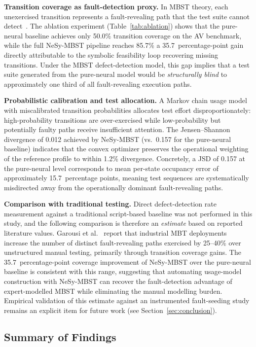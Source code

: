 \textbf{Transition coverage as fault-detection proxy.}
In MBST theory, each unexercised transition represents a fault-revealing
path that the test suite cannot detect~\cite{whittaker1993markov}.
The ablation experiment (Table~\ref{tab:ablation}) shows that the
pure-neural baseline achieves only 50.0\% transition coverage on the
AV benchmark, while the full NeSy-MBST pipeline reaches 85.7\% a
35.7~percentage-point gain directly attributable to the symbolic
feasibility loop recovering missing transitions.  Under the MBST
defect-detection model, this gap implies that a test suite generated
from the pure-neural model would be \emph{structurally blind} to
approximately one third of all fault-revealing execution paths.

\textbf{Probabilistic calibration and test allocation.}
A Markov chain usage model with miscalibrated transition probabilities
allocates test effort disproportionately: high-probability transitions
are over-exercised while low-probability but potentially faulty paths
receive insufficient attention.  The Jensen--Shannon divergence of
0.012 achieved by NeSy-MBST (vs.\ 0.157 for the pure-neural baseline)
indicates that the convex optimizer preserves the operational weighting
of the reference profile to within 1.2\% divergence.  Concretely,
a JSD of 0.157 at the pure-neural level corresponds to mean per-state
occupancy error of approximately 15.7~percentage points, meaning test
sequences are systematically misdirected away from the operationally
dominant fault-revealing paths.

\textbf{Comparison with traditional testing.}
Direct defect-detection rate measurement against a traditional
script-based baseline was not performed in this study, and the
following comparison is therefore an \emph{estimate} based on
reported literature values.  Garousi et al.~\cite{garousi2021mbt_practice}
report that industrial MBT deployments increase the number of
distinct fault-revealing paths exercised by 25--40\% over
unstructured manual testing, primarily through transition coverage
gains.  The 35.7~percentage-point coverage improvement of NeSy-MBST
over the pure-neural baseline is consistent with this range, suggesting
that automating usage-model construction with NeSy-MBST can recover
the fault-detection advantage of expert-modelled MBST while eliminating
the manual modelling burden.  Empirical validation of this estimate
against an instrumented fault-seeding study remains an explicit item
for future work (see Section~\ref{sec:conclusion}).

\subsection{Summary of Findings}%
\label{sec:eval:summary}

